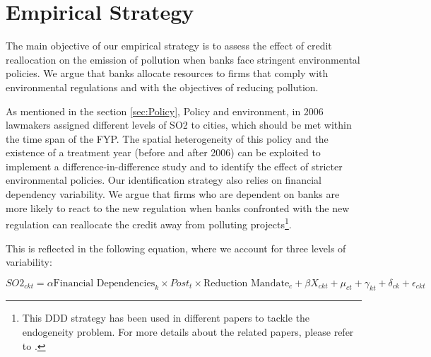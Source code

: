 \documentclass[12pt]{article}
\begin{document}
\section{Empirical Strategy} \label{sec:Empirical}

The main objective of our empirical strategy is to assess the effect of credit reallocation on the emission of pollution when banks face stringent environmental policies. We argue that banks allocate resources to firms that comply with environmental regulations and with the objectives of reducing pollution.

As mentioned in the section \ref{sec:Policy}, Policy and environment, in 2006 lawmakers assigned different levels of SO2  to cities, which should be met within the time span of the FYP. The spatial heterogeneity of this policy and the existence of a treatment year (before and after 2006) can be exploited to implement a difference-in-difference study and to identify the effect of stricter environmental policies. Our identification strategy also relies on financial dependency variability. We argue that firms who are dependent on banks are more likely to react to the new regulation when banks confronted with the new regulation can reallocate the credit away from polluting projects\footnote{This DDD strategy has been used in different papers to tackle the endogeneity problem. For more details about the related papers, please refer to \cite{Hering2014-af, Cai2016-br, Chen2018-ki, Shi2018-zk}.}.

This is reflected in the following equation, where we account for three levels of variability: 

\begin{equation} \label{eq:main}
SO2_{ckt} = \alpha\text{Financial Dependencies}_{k} \times Post_{t} \times \text{Reduction Mandate}_{c} + \beta X_{ckt} + \mu_{ct} + \gamma_{kt} + \delta_{ck} + \epsilon_{ckt}
\end{equation}
\end{document}
